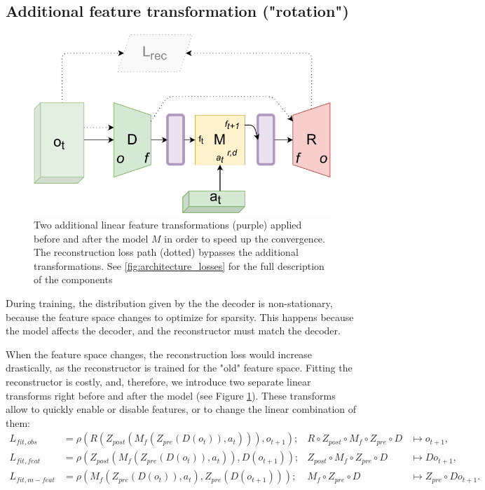 \documentclass[a4paper,11pt,oneside]{report}
\begin{document}
\subsection{Additional feature transformation ("rotation")}
\begin{figure}[h]
    \centering
    \includegraphics[width=0.7\linewidth]{diagrams/architecture_rotation}
    \caption{Two additional linear feature transformations (purple) applied before and after the model $M$ in order to speed up the convergence. The reconstruction loss path (dotted) bypasses the additional transformations. See \autoref{fig:architecture_losses} for the full description of the components}
    \label{fig:architecture_rotation}
\end{figure}


During training, the distribution given by the the decoder is non-stationary, because the feature space changes to optimize for sparsity. This happens because the model affects the decoder, and the reconstructor must match the decoder.

When the feature space changes, the reconstruction loss would increase drastically, as the reconstructor is trained for the "old" feature space. Fitting the reconstructor is costly, and, therefore, we introduce two separate linear transforms right before and after the model (see Figure \ref{fig:architecture_rotation}). These transforms allow to quickly enable or disable features, or to change the linear combination of them:
$$
\begin{array}{clll}
L_{fit, obs}&=\rho(R(Z_{post}(M_f(Z_{pre}(D(o_t)),a_t))), o_{t+1});& R\circ Z_{post}\circ M_f \circ Z_{pre}\circ D&\mapsto o_{t+1},\\
L_{fit, feat}&=\rho(Z_{post}(M_f(Z_{pre}(D(o_t)),a_t)), D(o_{t+1}));&Z_{post}\circ M_f\circ Z_{pre}\circ D&\mapsto Do_{t+1},\\
L_{fit, m-feat}&=\rho(M_f(Z_{pre}(D(o_t)),a_t), Z_{pre}(D(o_{t+1})));&M_f\circ Z_{pre}\circ D&\mapsto Z_{pre}\circ Do_{t+1}.\\
\end{array}
$$
\end{document}
